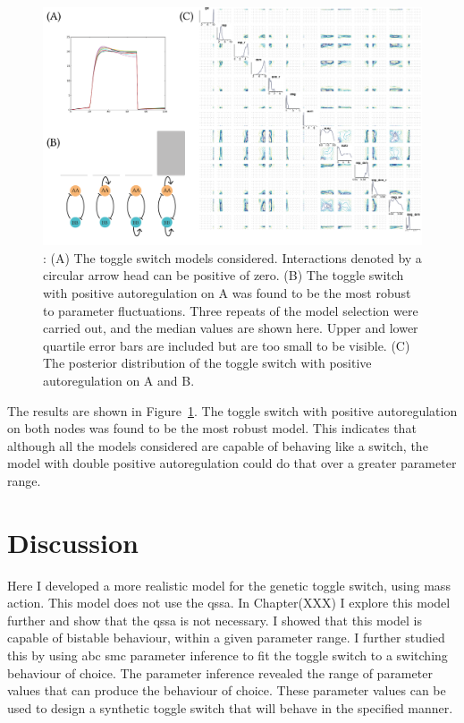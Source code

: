 \begin{figure}[htbp]
	\centerfloat
\includegraphics[scale=0.75]{../../chapters/chapterABCSysBio/images/model_sel_res-01.png}
\caption[ABC model selection resulting posterior distribution]{\label{fig:model_sel_res}: (A) The toggle switch models considered. Interactions denoted by a circular arrow head can be positive of zero. (B) The toggle switch with positive autoregulation on A was found to be the most robust to parameter fluctuations. Three repeats of the model selection were carried out, and the median values are shown here. Upper and lower quartile error bars are included but are too small to be visible. (C) The posterior distribution of the toggle switch with positive autoregulation on A and B.}


\end{figure}
\clearpage
The results are shown in Figure~\ref{fig:model_sel_res}. The toggle switch with positive autoregulation on both nodes was found to be the most robust model. This indicates that although all the models considered are capable of behaving like a switch, the model with double positive autoregulation could do that over a greater parameter range.  



\section{Discussion}

Here I developed a more realistic model for the genetic toggle switch, using mass action. This model does not use the \acrshort{qssa}. In Chapter(XXX) I explore this model further and show that the \acrshort{qssa} is not necessary. I showed that this model is capable of bistable behaviour, within a given parameter range. I further studied this by using \acrshort{abc} \acrshort{smc} parameter inference to fit the toggle switch to a switching behaviour of choice. The parameter inference revealed the range of parameter values that can produce the behaviour of choice. These parameter values can be used to design a synthetic toggle switch that will behave in the specified manner. 

